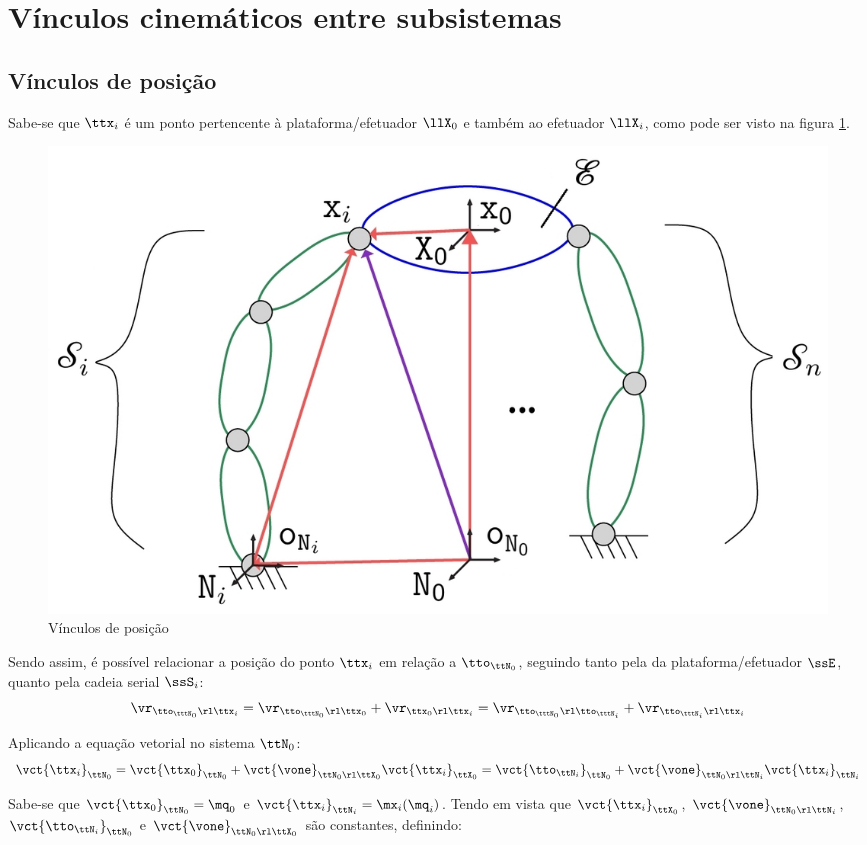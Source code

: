 \documentclass[]{politex}
\begin{document}
\section{Vínculos cinemáticos entre subsistemas} 
\subsection{Vínculos de posição} 

Sabe-se que $\ttx_i$ é um ponto pertencente à plataforma/efetuador $\llX_0$ e também ao efetuador $\llX_i$, como pode ser visto na figura \ref{fig:VinculosDePosicao}.
\begin{figure}[h]
	\centering
	\includegraphics[scale=1.0]{imagens/VinculosDePosicao.jpg}  
	\caption{Vínculos de posição}
	\label{fig:VinculosDePosicao}
\end{figure}

Sendo assim, é possível relacionar a posição do ponto $\ttx_i$ em relação a $\tto_{\ttN_0}$, seguindo tanto pela da plataforma/efetuador $\ssE$, quanto pela cadeia serial $\ssS_i$:
\begin{equation}
\vr_{\tto_{\tttN_0} \rl \ttx_i} = \vr_{\tto_{\tttN_0} \rl \ttx_0} + \vr_{\ttx_0 \rl \ttx_i} = \vr_{\tto_{\tttN_0} \rl \tto_{\tttN_i}} + \vr_{\tto_{\tttN_i} \rl \ttx_i}
\end{equation}

Aplicando a equação vetorial no sistema $\ttN_0$:
\begin{equation}
\vct{\ttx_i}_{\ttN_0} =  \vct{\ttx_0}_{\ttN_0} + \vct{\vone}_{\ttN_0 \rl \ttX_0} \vct{\ttx_i}_{\ttX_0} = \vct{\tto_{\ttN_i}}_{\ttN_0}  + \vct{\vone}_{\ttN_0 \rl \ttN_i} \vct{\ttx_i}_{\ttN_i}
\end{equation}

Sabe-se que $\vct{\ttx_0}_{\ttN_0} = \mq_0$ e $\vct{\ttx_i}_{\ttN_i} = \mx_i(\mq_i)$. Tendo em vista que $\vct{\ttx_i}_{\ttX_0}$, $\vct{\vone}_{\ttN_0 \rl \ttN_i}$, $\vct{\tto_{\ttN_i}}_{\ttN_0}$ e $\vct{\vone}_{\ttN_0 \rl \ttX_0}$ são constantes, definindo:
\end{document}
